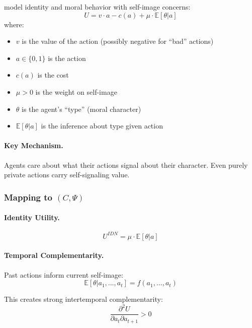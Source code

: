 \citet{benaboutirole} model identity and moral behavior with self-image concerns:
\begin{equation}
  U = v \cdot a - c(a) + \mu \cdot \mathbb{E}[\theta | a]
  \label{eq:btutility}
\end{equation}
where:
\begin{itemize}
  \item $v$ is the value of the action (possibly negative for ``bad'' actions)
  \item $a \in \{0, 1\}$ is the action
  \item $c(a)$ is the cost
  \item $\mu > 0$ is the weight on self-image
  \item $\theta$ is the agent's ``type'' (moral character)
  \item $\mathbb{E}[\theta | a]$ is the inference about type given action
\end{itemize}

\paragraph{Key Mechanism.}
Agents care about what their actions signal about their character.
Even purely private actions carry self-signaling value.

\subsubsection{Mapping to $(C, \Psi)$}

\paragraph{Identity Utility.}
\begin{equation}
  U^{IDN} = \mu \cdot \mathbb{E}[\theta | a]
\end{equation}

\paragraph{Temporal Complementarity.}
Past actions inform current self-image:
\begin{equation}
  \mathbb{E}[\theta | a_1, \ldots, a_t] = f(a_1, \ldots, a_t)
\end{equation}

This creates strong intertemporal complementarity:
\begin{equation}
  \frac{\partial^2 U}{\partial a_t \partial a_{t+1}} > 0
\end{equation}

